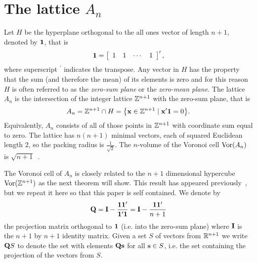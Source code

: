 \documentclass[draftcls, onecolumn, 11pt]{IEEEtran}
\begin{document}
\section{The lattice $A_n$}\label{sec:lattice-a_n}
Let $H$ be the hyperplane orthogonal to the all ones vector of length $n+1$, denoted by $\boldsymbol{1}$, that is
\[
\boldsymbol{1} = \left[ \begin{array}{cccc} 1 & 1 & \cdots & 1 \end{array} \right]^\prime,
\]
where superscript $^\prime$ indicates the transpose.  Any vector in $H$ has the property that the sum (and therefore the mean) of its elements is zero and for this reason $H$ is often referred to as the \emph{zero-sum plane} or the \emph{zero-mean plane}.
The lattice $A_n$ is the intersection of the integer lattice ${\mathbb Z}^{n+1}$ with the zero-sum plane, that is
\begin{equation}
\label{eq:An_sub_Zn}
  A_{n} = \ints^{n+1} \cap H = \big\{ \xbf \in \ints^{n+1} \mid \dotprod{\xbf}{\onebf} = 0  \big\}.
\end{equation}
Equivalently, $A_n$ consists of all of those points in ${\mathbb Z}^{n+1}$ with coordinate sum equal to zero.
The lattice has $n(n+1)$ minimal vectors, each of squared Euclidean length $2$, so the packing radius is $\frac{1}{\sqrt{2}}$.  The $n$-volume of the Voronoi cell $\operatorname{Vor}(A_n)$ is $\sqrt{n+1}$~\cite[p. 108]{SPLAG}.

The Voronoi cell of $A_n$ is closely related to the $n+1$ dimensional hypercube $\operatorname{Vor}({\mathbb Z}^{n+1})$ as the next theorem will show.  This result has appeared previously~\cite{McKilliam2009CoxeterLattices,McKilliam2010thesis}, but we repeat it here so that this paper is self contained.  We denote by
\[
\mathbf{Q} = \mathbf{I} - \frac{\boldsymbol{1}\boldsymbol{1}^\prime}{\boldsymbol{1}^\prime \boldsymbol{1}} = \mathbf{I} - \frac{\boldsymbol{1}\boldsymbol{1}^\prime}{n+1}
\]
the projection matrix orthogonal to $\boldsymbol{1}$ (i.e. into the zero-sum plane) where $\mathbf{I}$ is the $n+1$ by $n+1$ identity matrix.  Given a set $S$ of vectors from ${\mathbb R}^{n+1}$ we write $\mathbf{Q} S$  to denote the set with elements $\mathbf{Q} \mathbf{s}$ for all $\mathbf{s} \in S$, i.e. the set containing the projection of the vectors from $S$.
\end{document}
